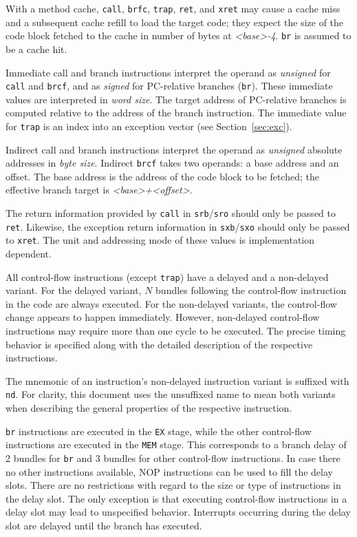 \documentclass[a4paper,fontsize=10pt,twoside,DIV15,BCOR12mm,headinclude=true,footinclude=false,pagesize,bibtotoc]{scrbook}
\newcommand{\comment}[3]{

\textsf{\textbf{#1}} {\color{#3}#2}}
\newcommand{\wolf}[1]{\comment{Wolfgang}{#1}{OliveGreen}}
\renewcommand{\wolf}[1]{}
\begin{document}
With a method cache, \texttt{call}, \texttt{brfc}, \texttt{trap},
\texttt{ret}, and \texttt{xret} may cause a cache miss and a
subsequent cache refill to load the target code; they expect the size
of the code block fetched to the cache in number of bytes at
\textit{<base>-4}. \texttt{br} is assumed to be a cache hit.

Immediate call and branch instructions interpret the operand as
\emph{unsigned} for \texttt{call} and \texttt{brcf}, and as
\emph{signed} for PC-relative branches (\texttt{br}). These immediate
values are interpreted in \emph{word size}. The target address of
PC-relative branches is computed relative to the address of the branch
instruction. The immediate value for \texttt{trap} is an index into an
exception vector (see Section~\ref{sec:exc}).

Indirect call and branch instructions interpret the operand as
\emph{unsigned} absolute addresses in \emph{byte size}. Indirect
\texttt{brcf} takes two operands: a base address and an offset. The
base address is the address of the code block to be fetched; the
effective branch target is \textit{<base>+<offset>}.

The return information provided by \texttt{call} in
\texttt{srb}/\texttt{sro} should only be passed to
\texttt{ret}. Likewise, the exception return information in
\texttt{sxb}/\texttt{sxo} should only be passed to \texttt{xret}. The
unit and addressing mode of these values is implementation
dependent.\wolf{Should we keep it implementation dependent, or should
  we enforce way it is in the current implementation?}

All control-flow instructions (except \texttt{trap}) have a delayed
and a non-delayed variant. For the delayed variant, $N$
bundles following the control-flow instruction in the code are always
executed. For the non-delayed variants, the control-flow change
appears to happen immediately. However, non-delayed control-flow
instructions may require more than one cycle to be executed. The
precise timing behavior is specified along with the detailed
description of the respective instructions.

The mnemonic of an instruction's non-delayed instruction variant is
suffixed with \texttt{nd}. For clarity, this document uses the
unsuffixed name to mean both variants when describing the general
properties of the respective instruction.

\texttt{br} instructions are executed in the \texttt{EX} stage, while
the other control-flow instructions are executed in the \texttt{MEM}
stage. This corresponds to a branch delay of 2 bundles for \texttt{br}
and 3 bundles for other control-flow instructions. In case there no
other instructions available, NOP instructions can be used to fill the
delay slots. There are no restrictions with regard to the size or type
of instructions in the delay slot. The only exception is that
executing control-flow instructions in a delay slot may lead to
unspecified behavior.
Interrupts occurring during the delay slot are delayed until the
branch has executed.
\end{document}
